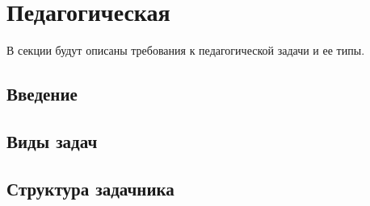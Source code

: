 \section{Педагогическая }

В секции будут описаны требования к педагогической задачи и ее типы.

\subsection{Введение}



\subsection{Виды задач}



\subsection{Структура задачника}

